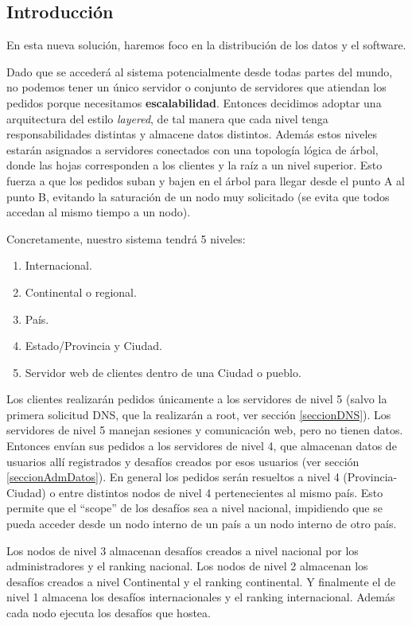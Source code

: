 \subsection{Introducción}

En esta nueva solución, haremos foco en la distribución de los datos y el software.

Dado que se accederá al sistema potencialmente desde todas partes del mundo, no podemos tener un único servidor o conjunto de servidores que atiendan los pedidos porque necesitamos {\bf escalabilidad}. Entonces decidimos adoptar una arquitectura del estilo \emph{layered}, de tal manera que cada nivel tenga responsabilidades distintas y almacene datos distintos. Además estos niveles estarán asignados a servidores conectados con una topología lógica de árbol, donde las hojas corresponden a los clientes y la raíz a un nivel superior. Esto fuerza a que los pedidos suban y bajen en el árbol para llegar desde el punto A al punto B, evitando la saturación de un nodo muy solicitado (se evita que todos accedan al mismo tiempo a un nodo).

Concretamente, nuestro sistema tendrá 5 niveles:
\begin{enumerate}
	\item Internacional.
	\item Continental o regional.
	\item País.
	\item Estado/Provincia y Ciudad.
	\item Servidor web de clientes dentro de una Ciudad o pueblo.
\end{enumerate}

Los clientes realizarán pedidos únicamente a los servidores de nivel 5 (salvo la primera solicitud DNS, que la realizarán a root, ver sección \ref{seccionDNS}). Los servidores de nivel 5 manejan sesiones y comunicación web, pero no tienen datos. Entonces envían sus pedidos a los servidores de nivel 4, que almacenan datos de usuarios allí registrados y desafíos creados por esos usuarios (ver sección \ref{seccionAdmDatos}). En general los pedidos serán resueltos a nivel 4 (Provincia-Ciudad) o entre distintos nodos de nivel 4 pertenecientes al mismo país. Esto permite que el ``scope'' de los desafíos sea a nivel nacional, impidiendo que se pueda acceder desde un nodo interno de un país a un nodo interno de otro país.

Los nodos de nivel 3 almacenan desafíos creados a nivel nacional por los administradores y el ranking nacional. Los nodos de nivel 2 almacenan los desafíos creados a nivel Continental y el ranking continental. Y finalmente el de nivel 1 almacena los desafíos internacionales y el ranking internacional. Además cada nodo ejecuta los desafíos que hostea.

